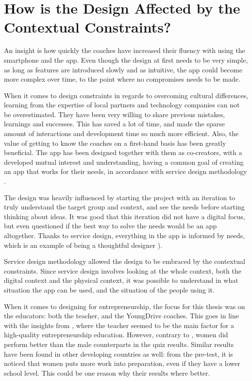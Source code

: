 
\section{How is the Design Affected by the Contextual Constraints?} %

  An insight is how quickly the coaches have increased their fluency with using the smartphone and the app. Even though the design at first needs to be very simple, as long as features are introduced slowly and as intuitive, the app could become more complex over time, to the point where no compromises needs to be made.

  When it comes to design constraints in regards to overcoming cultural differences, learning from the expertise of local partners and technology companies can not be overestimated. They have been very willing to share previous mistakes, learnings and successes. This has saved a lot of time, and made the sparse amount of interactions and development time so much more efficient. Also, the value of getting to know the coaches on a first-hand basis has been greatly beneficial. The app has been designed together with them as co-creators, with a developed mutual interest and understanding, having a common goal of creating an app that works for their needs, in accordance with service design methodology \citep{stickdorn}.

  The design was heavily influenced by starting the project with an iteration to truly understand the target group and context, and see the needs before starting thinking about ideas. It was good that this iteration did not have a digital focus, but even questioned if the best way to solve the needs would be an app altogether. Thanks to service design, everything in the app is informed by needs, which is an example of being a thoughtful designer \citep{lowgren} \citep{stickdorn}).

  Service design methodology allowed the design to be embraced by the contextual constraints. Since service design involves looking at the whole context, both the digital context and the physical context, it was possible to understand in what situation the app can be used, and the situation of the people using it.

  When it comes to designing for entrepreneurship, the focus for this thesis was on the educators: both the teacher, and the YoungDrive coaches. This goes in line with the insights from \cite{ruskovaara}, where the teacher seemed to be the main factor for a high-quality entrepreneurship education. However, contrary to \cite{ruskovaara}, women did perform better than the male counterparts in the quiz results. Similar results have been found in other developing countries as well: from the pre-test, it is noticed that women puts more work into preparation, even if they have a lower school level. This could be one reason why their results where better.

